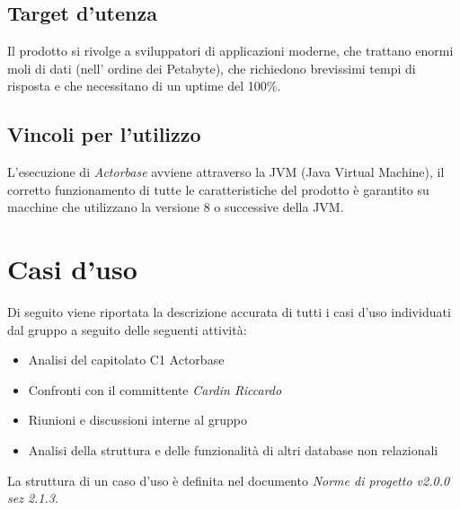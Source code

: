 \documentclass[a4paper]{article}
\begin{document}
	\subsection{Target d'utenza}
		Il prodotto si rivolge a sviluppatori di applicazioni moderne, che trattano enormi moli di dati (nell'
		ordine dei Petabyte), che richiedono brevissimi tempi di risposta e che necessitano di un uptime 
		del 100\%.
	\subsection{Vincoli per l'utilizzo}
		L'esecuzione di \emph{Actorbase} avviene attraverso la JVM (Java Virtual Machine), il corretto funzionamento di tutte le caratteristiche del prodotto è garantito su macchine che utilizzano la versione 8 o successive della JVM. 
	
	\newpage \section{Casi d'uso}
		Di seguito viene riportata la descrizione accurata di tutti i casi d'uso individuati dal gruppo a seguito
		delle seguenti attività:
		\begin{itemize}
			\item Analisi del capitolato C1 Actorbase
			\item Confronti con il committente \emph{Cardin Riccardo}
			\item Riunioni e discussioni interne al gruppo
			\item Analisi della struttura e delle funzionalità di altri database non relazionali
		\end{itemize}
		La struttura di un caso d'uso è definita nel documento \emph{Norme di progetto v2.0.0 sez 2.1.3}.
\end{document}
